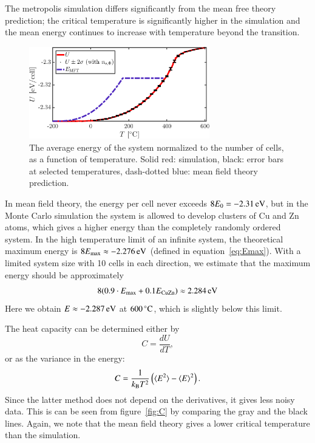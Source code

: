 The metropolis simulation differs significantly from the mean free theory prediction; the critical temperature is significantly higher in the simulation and the mean energy continues to increase with temperature beyond the transition. 

\begin{figure}[!ht]
\begin{center}
  \includegraphics[width=0.7\textwidth]{../figures/U} 
  \caption{The average energy of the system normalized to the number of cells, as a function of temperature. Solid red: simulation, black: error bars at selected temperatures, dash-dotted blue: mean field theory prediction.}
  \label{fig:U}
\end{center}
\end{figure}

In mean field theory, the energy per cell never exceeds $8 E_0 = \unit[-2.31]{eV}$, but in the Monte Carlo simulation the system is allowed to develop clusters of Cu and Zn atoms, which gives a higher energy than the completely randomly ordered system. In the high temperature limit of an infinite system, the theoretical maximum energy is $ 8 E_{\rm max} \approx \unit[-2.276]{eV}$ (defined in equation~\eqref{eq:Emax}). With a limited system size with 10 cells in each direction, we estimate that the maximum energy should be approximately 
\begin{equation}
8 (0.9\cdot E_{\rm max} + 0.1 E_{\rm CuZn}) \approx \unit[2.284]{eV}
\end{equation}
Here we obtain $E \approx \unit[-2.287]{eV}$ at $\unit[600]{^\circ C}$, which is slightly below this limit. 

The heat capacity can be determined either by 
\begin{equation}
C = \frac{d U}{d T},
\label{eq:C1}
\end{equation}
or as the variance in the energy:
\begin{equation}
C = \frac{1}{k_{\rm B} T^2}\left(\langle E^2 \rangle  - \langle E \rangle^2 \right)
\label{eq:C2}.
\end{equation}
Since the latter method does not depend on the derivatives, it gives less noisy data. This is can be seen from figure~\ref{fig:C} by comparing the gray and the black lines. Again, we note that the mean field theory gives a lower critical temperature than the simulation. 


